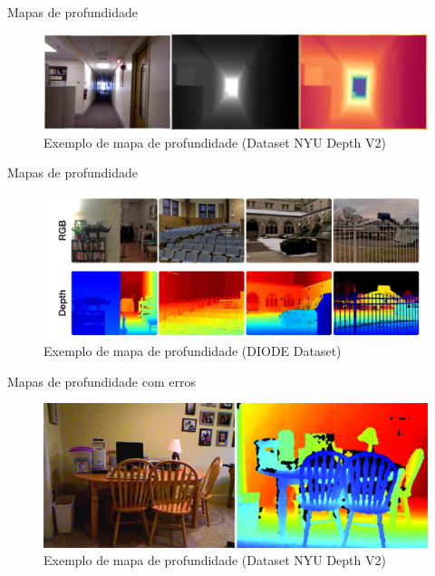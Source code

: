 \documentclass[aspectratio=169]{beamer}
\begin{document}
\begin{frame}{Mapas de profundidade}

\begin{figure}
    \centering
    \includegraphics[width=\textwidth]{figs/example_depth.png}
    \caption{Exemplo de mapa de profundidade (Dataset NYU Depth V2)}
\end{figure}
\end{frame}

\begin{frame}{Mapas de profundidade}

\begin{figure}
    \centering
    \includegraphics[width=\textwidth]{figs/exemplo1.png}
    \caption{Exemplo de mapa de profundidade (DIODE Dataset)}
\end{figure}
\end{frame}


\begin{frame}{Mapas de profundidade com erros}

\begin{figure}
    \centering
    \includegraphics[scale=2]{figs/nyu_depth_v2_raw.jpg}
    \caption{Exemplo de mapa de profundidade (Dataset NYU Depth V2)}
\end{figure}
\end{frame}
\end{document}
